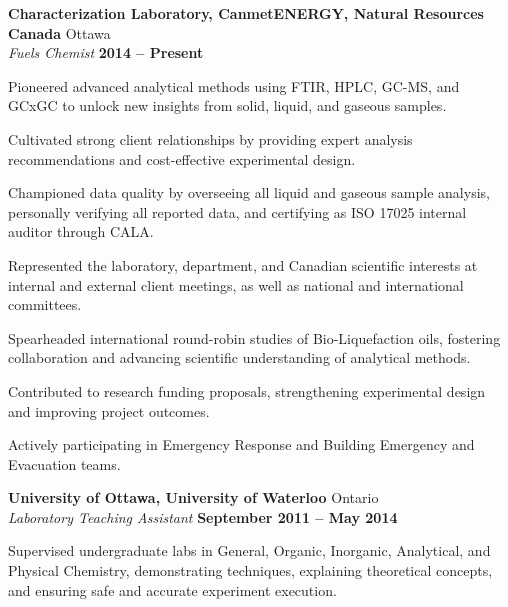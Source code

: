 \documentclass[margin,line]{resumecls}
\begin{document}
\begin{resume}
    \textbf{Characterization Laboratory, CanmetENERGY, Natural Resources Canada} \hfill Ottawa \\\vspace{1mm}%
    \textsl{Fuels Chemist} \hfill \textbf{2014 -- Present}\\\vspace{-5mm}%
    \begin{list2}
        \item Pioneered advanced analytical methods using FTIR, HPLC, GC-MS, and GCxGC to unlock new insights from solid, liquid, and gaseous samples.
        \item Cultivated strong client relationships by providing expert analysis recommendations and cost-effective experimental design.
        \item Championed data quality by overseeing all liquid and gaseous sample analysis, personally verifying all reported data, and certifying as ISO 17025 internal auditor through CALA.
        \item Represented the laboratory, department, and Canadian scientific interests at internal and external client meetings, as well as national and international committees.
        \item Spearheaded international round-robin studies of Bio-Liquefaction oils, fostering collaboration and advancing scientific understanding of analytical methods.
        \item Contributed to research funding proposals, strengthening experimental design and improving project outcomes.
        \item Actively participating in Emergency Response and Building Emergency and Evacuation teams.
    \end{list2}
    \textbf{University of Ottawa, University of Waterloo} \hfill Ontario \\\vspace{1mm}%
    \textsl{Laboratory Teaching Assistant} \hfill \textbf{September 2011 -- May 2014}\\\vspace{-5mm}%
    \begin{list2}
        \item Supervised undergraduate labs in General, Organic, Inorganic, Analytical, and Physical Chemistry, demonstrating techniques, explaining theoretical concepts, and ensuring safe and accurate experiment execution.
    \end{list2}


\end{resume}
\end{document}
